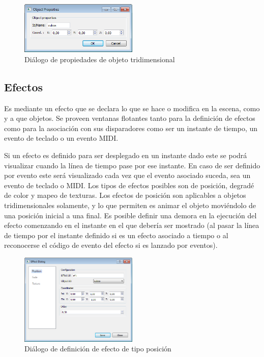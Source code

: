 \begin{figure}[H]
  \centering
    \includegraphics[width=0.5\textwidth]{./Cap5_vmt/vmt_objectProperties.png}
  \caption{Diálogo de propiedades de objeto tridimensional}
  \label{fig:VMT-ObjectProperties}
\end{figure}

\subsection{Efectos}

Es mediante un efecto que se declara lo que se hace o modifica en la escena, como y a que objetos. Se proveen ventanas flotantes tanto para la definición de efectos como para la asociación con sus disparadores como ser un instante de tiempo, un evento de teclado o un evento MIDI.

Si un efecto es definido para ser desplegado en un instante dado este se podrá visualizar cuando la línea de tiempo pase por ese instante. En caso de ser definido por evento este será visualizado cada vez que el evento asociado suceda, sea un evento de teclado o MIDI.
Los tipos de efectos posibles son de posición, degradé de color y mapeo de texturas.
Los efectos de posición son aplicables a objetos tridimensionales solamente, y lo que permiten es animar el objeto moviéndolo de una posición inicial a una final. Es posible definir una demora en la ejecución del efecto comenzando en el instante en el que debería ser mostrado (al pasar la línea de tiempo por el instante definido si es un efecto asociado a tiempo o al reconocerse el código de evento del efecto si es lanzado por eventos).

\begin{figure}[H]
  \centering
    \includegraphics[width=0.5\textwidth]{./Cap5_vmt/vmt_EfectDialog1.png}
  \caption{Diálogo de definición de efecto de tipo posición}
  \label{fig:VMT-EffectPossition}
\end{figure}

